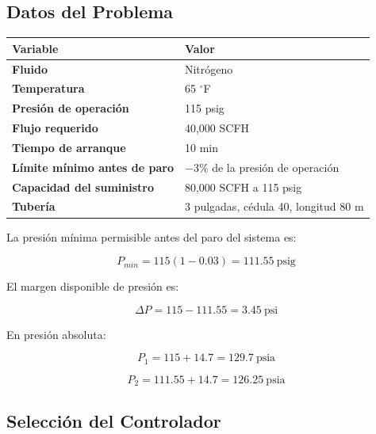 \documentclass[12pt,letterpaper]{article}
\begin{document}
\subsection*{Datos del Problema}

\begin{center}
\begin{tabular}{>{\bfseries}p{5cm} p{7cm}}
\toprule
\textbf{Variable} & \textbf{Valor} \\
\midrule
Fluido & Nitrógeno \\
Temperatura & 65 $^\circ$F \\
Presión de operación & 115 psig \\
Flujo requerido & 40,000 SCFH \\
Tiempo de arranque & 10 min \\
Límite mínimo antes de paro & $-3\%$ de la presión de operación \\
Capacidad del suministro & 80,000 SCFH a 115 psig \\
Tubería & 3 pulgadas, cédula 40, longitud 80 m \\
\bottomrule
\end{tabular}
\end{center}

La presión mínima permisible antes del paro del sistema es:

\begin{equation}
    P_{min}=115(1-0.03)=111.55\ \text{psig}
\end{equation}

El margen disponible de presión es:

\begin{equation}
    \Delta P=115-111.55=3.45\ \text{psi}
\end{equation}

En presión absoluta:

\begin{equation}
    P_1=115+14.7=129.7\ \text{psia}
\end{equation}

\begin{equation}
    P_2=111.55+14.7=126.25\ \text{psia}
\end{equation}

\subsection*{Selección del Controlador}
\end{document}
